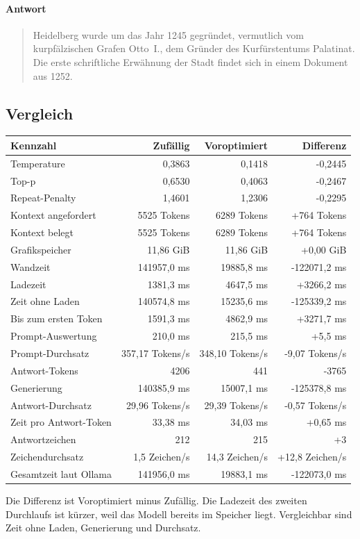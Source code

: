 \documentclass[11pt,a4paper]{article}
\begin{document}
\paragraph{Antwort}
\begin{quote}
\raggedright
Heidelberg wurde um das Jahr 1245 gegründet, vermutlich vom kurpfälzischen Grafen Otto I., dem Gründer des Kurfürstentums Palatinat. Die erste schriftliche Erwähnung der Stadt findet sich in einem Dokument aus 1252.
\end{quote}

\subsection*{Vergleich}
{\footnotesize
\setlength{\tabcolsep}{5pt}
\begin{tabular}{@{}lrrr@{}}
\toprule
\textbf{Kennzahl} & \textbf{Zufällig} & \textbf{Voroptimiert} & \textbf{Dif{}ferenz} \\
\midrule
Temperature & 0,3863 & 0,1418 & -0,2445 \\
Top-p & 0,6530 & 0,4063 & -0,2467 \\
Repeat-Penalty & 1,4601 & 1,2306 & -0,2295 \\
Kontext angefordert & 5525 Tokens & 6289 Tokens & +764 Tokens \\
Kontext belegt & 5525 Tokens & 6289 Tokens & +764 Tokens \\
Grafikspeicher & 11,86 GiB & 11,86 GiB & +0,00 GiB \\
Wandzeit & 141957,0 ms & 19885,8 ms & -122071,2 ms \\
Ladezeit & 1381,3 ms & 4647,5 ms & +3266,2 ms \\
Zeit ohne Laden & 140574,8 ms & 15235,6 ms & -125339,2 ms \\
Bis zum ersten Token & 1591,3 ms & 4862,9 ms & +3271,7 ms \\
Prompt-Auswertung & 210,0 ms & 215,5 ms & +5,5 ms \\
Prompt-Durchsatz & 357,17 Tokens/s & 348,10 Tokens/s & -9,07 Tokens/s \\
Antwort-Tokens & 4206 & 441 & -3765 \\
Generierung & 140385,9 ms & 15007,1 ms & -125378,8 ms \\
Antwort-Durchsatz & 29,96 Tokens/s & 29,39 Tokens/s & -0,57 Tokens/s \\
Zeit pro Antwort-Token & 33,38 ms & 34,03 ms & +0,65 ms \\
Antwortzeichen & 212 & 215 & +3 \\
Zeichendurchsatz & 1,5 Zeichen/s & 14,3 Zeichen/s & +12,8 Zeichen/s \\
Gesamtzeit laut Ollama & 141956,0 ms & 19883,1 ms & -122073,0 ms \\
\bottomrule
\end{tabular}
}

\medskip
\noindent Die Dif{}ferenz ist Voroptimiert minus Zufällig. Die Ladezeit des zweiten Durchlaufs ist kürzer, weil das Modell bereits im Speicher liegt. Vergleichbar sind Zeit ohne Laden, Generierung und Durchsatz.
\end{document}
